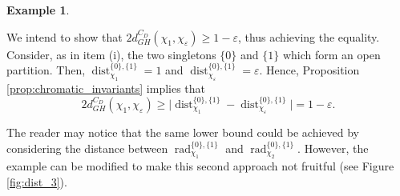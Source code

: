 \documentclass[8pt,a4paper,oneside,english,english]{article}
\theoremstyle{plain}
\theoremstyle
{plain}
\theoremstyle{definition}
\newtheorem{example}[theorem]{Example}%
\newcommand{\GH}{d_{GH}}
\DeclareMathOperator{\dist}{dist}
\DeclareMathOperator{\rad}{rad}
\begin{document}
\begin{example}
\begin{compactenum}[(i)]
We intend to show that $2\GH^{C_D}(\chi_1,\chi_\varepsilon)\geq 1-\varepsilon$, thus achieving the equality. Consider, as in item (i), the two singletons $\{0\}$ and $\{1\}$ which form an open partition. Then, $\dist_{\chi_1}^{\{0\},\{1\}}=1$ and $\dist_{\chi_\varepsilon}^{\{0\},\{1\}}=\varepsilon$. Hence, Proposition \ref{prop:chromatic_invariants} implies that
\[
2\GH^{C_D}(\chi_1,\chi_\varepsilon)\geq\lvert\dist_{\chi_1}^{\{0\},\{1\}}-\dist_{\chi_\varepsilon}^{\{0\},\{1\}}\rvert=1-\varepsilon. 
\]

The reader may notice that the same lower bound could be achieved by considering the distance between $\rad_{\chi_1}^{\{0\},\{1\}}$ and $\rad_{\chi_2}^{\{0\},\{1\}}$. However, the example can be modified to make this second approach not fruitful (see Figure \ref{fig:dist_3}).
\begin{figure}
[h!]
    \centering
\end{figure}
\end{compactenum}
\end{example}
\end{document}
